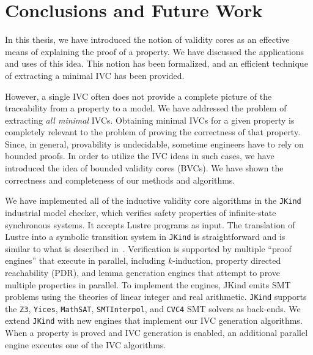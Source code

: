 \chapter{Conclusions and Future Work}
\label{ch:con}
In this thesis, we have introduced the notion of validity cores as an effective means of explaining the proof of a property. We have discussed the applications and uses of this idea.
This notion has been formalized, and an efficient technique of extracting a minimal IVC has been provided.

However, a single IVC often does not provide a complete picture of the traceability from a property to a model.  We have addressed the problem of extracting {\em all minimal} IVCs. Obtaining minimal IVCs for a given property is completely relevant to the problem of proving the correctness of that property.
Since, in general, provability is undecidable, sometime engineers have to rely on bounded proofs. In order to utilize the IVC ideas in such cases, we have introduced the idea of bounded validity cores (BVCs).
We have shown
the correctness and completeness of our methods and algorithms.

We have implemented all of the inductive validity core algorithms in the \texttt{JKind} ~\cite{jkind} industrial model checker,
which verifies safety properties of infinite-state synchronous systems.
It accepts Lustre programs \cite{Halbwachs91:lustre} as input.  The translation of Lustre
into a symbolic transition system in \texttt{JKind} is straightforward and is similar to what is described
in~\cite{Hagen08:FMCAD}.
Verification is supported by multiple ``proof engines'' that execute in parallel, including $k$-induction,
property directed reachability (PDR), and lemma generation engines that attempt to prove
multiple properties in parallel.  To implement the engines,
JKind emits SMT problems using the theories of linear integer and real arithmetic. \texttt{JKind} supports the \texttt{Z3}, \texttt{Yices}, \texttt{MathSAT}, \texttt{SMTInterpol}, and \texttt{CVC4} SMT solvers as back-ends.  We extend \texttt{JKind} with new engines that implement our IVC generation algorithms. When a property is
proved and IVC generation is enabled, an additional parallel engine
executes one of the IVC algorithms.


